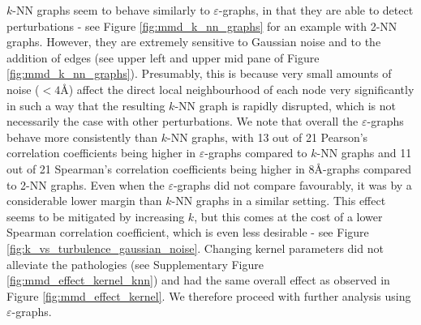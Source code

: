 $k$-NN graphs seem to behave similarly to $\varepsilon$-graphs, in that they are
able to detect perturbations - see Figure \ref{fig:mmd_k_nn_graphs} for an
example with 2-NN graphs. However, they are extremely sensitive to Gaussian
noise and to the addition of edges (see upper left and upper mid pane of Figure
\ref{fig:mmd_k_nn_graphs}). Presumably, this is because very small amounts of
noise ($<4$\si{\angstrom}) affect the direct local neighbourhood of each node
very significantly in such a way that the resulting $k$-NN graph is rapidly
disrupted, which is not necessarily the case with other perturbations. We note
that overall the $\varepsilon$-graphs behave more consistently than $k$-NN
graphs, with 13 out of 21 Pearson's correlation coefficients being higher in
$\varepsilon$-graphs compared to $k$-NN graphs and 11 out of 21 Spearman's
correlation coefficients being higher in 8\si{\angstrom}-graphs compared to 2-NN
graphs. Even when the $\varepsilon$-graphs did not compare favourably, it was by
a considerable lower margin than $k$-NN graphs in a similar setting. This effect
seems to be mitigated by increasing $k$, but this comes at the cost of a lower
Spearman correlation coefficient, which is even less desirable - see Figure
\ref{fig:k_vs_turbulence_gaussian_noise}. Changing kernel parameters did not
alleviate the pathologies (see Supplementary Figure
\ref{fig:mmd_effect_kernel_knn}) and had the same overall effect as observed in
Figure \ref{fig:mmd_effect_kernel}. We therefore proceed with further analysis
using $\varepsilon$-graphs.


